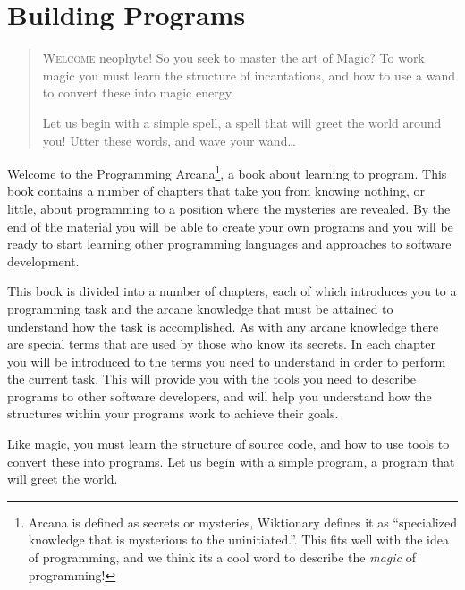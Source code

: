 \chapter{Building Programs} %
\label{cha:building programs}

\begin{quote}
  \Fontlukas\Large
  \renewcommand{\LettrineTextFont}{\relax}
  \renewcommand{\LettrineFontHook}{\color{red}}
  \lettrine[image=true,lines=1,lhang=.2, loversize=.25, findent=0.1em]
  {W}{elcome} neophyte! So you seek to master the art of Magic? To work magic you must learn the structure of incantations, and how to use a wand to convert these into magic energy. 
  
  Let us begin with a simple spell, a spell that will greet the world around you! Utter these words, and wave your wand\ldots
\end{quote}

\bigskip

Welcome to the Programming Arcana\footnote{Arcana is defined as secrets or mysteries, Wiktionary defines it as ``specialized knowledge that is mysterious to the uninitiated.''. This fits well with the idea of programming, and we think its a cool word to describe the \emph{magic} of programming!}, a book about learning to program. This book contains a number of chapters that take you from knowing nothing, or little, about programming to a position where the mysteries are revealed. By the end of the material you will be able to create your own programs and you will be ready to start learning other programming languages and approaches to software development.

This book is divided into a number of chapters, each of which introduces you to a programming task and the arcane knowledge that must be attained to understand how the task is accomplished. As with any arcane knowledge there are special terms that are used by those who know its secrets. In each chapter you will be introduced to the terms you need to understand in order to perform the current task. This will provide you with the tools you need to describe programs to other software developers, and will help you understand how the structures within your programs work to achieve their goals.

Like magic, you must learn the structure of source code, and how to use tools to convert these into programs. Let us begin with a simple program, a program that will greet the world.

\minitoc

